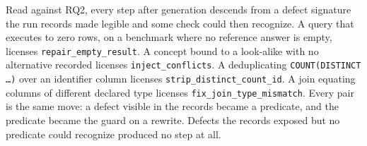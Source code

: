 Read against RQ2, every step after generation descends from a defect signature
the run records made legible and some check could then recognize. A query that
executes to zero rows, on a benchmark where no reference answer is empty,
licenses \texttt{repair\_empty\_result}. A concept bound to a look-alike with
no alternative recorded licenses \texttt{inject\_conflicts}. A deduplicating
\texttt{COUNT(DISTINCT \dots{})} over an identifier column licenses
\texttt{strip\_distinct\_count\_id}. A join equating columns of different
declared type licenses \texttt{fix\_join\_type\_mismatch}. Every pair is the
same move: a defect visible in the records became a predicate, and the
predicate became the guard on a rewrite. Defects the records exposed but no
predicate could recognize produced no step at all.
